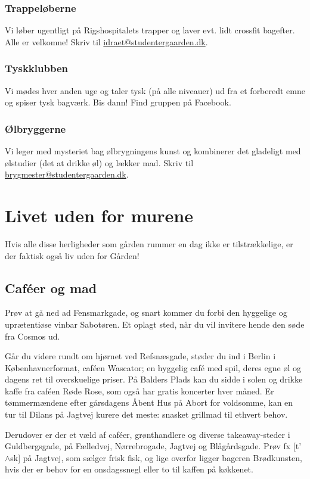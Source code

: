 \documentclass[11pt,article,twoside,openany,danish,extrafontsizes]{memoir} %
\begin{document}
\subsection{Trappeløberne}
Vi løber ugentligt på Rigshospitalets trapper og laver evt. lidt crossfit bagefter. Alle er velkomne! Skriv til \url{idraet@studentergaarden.dk}.

\subsection{Tyskklubben}
Vi mødes hver anden uge og taler tysk (på alle niveauer) ud fra et forberedt emne og  spiser tysk bagværk. Bis dann! Find gruppen på Facebook.

\subsection{Ølbryggerne}
Vi leger med mysteriet bag ølbrygningens kunst og kombinerer det gladeligt med ølstudier (det at drikke øl) og lækker mad. Skriv til \url{brygmester@studentergaarden.dk}.


\clearpage


\chapter{Livet uden for murene}
\label{chap:udenfor}

Hvis alle disse herligheder som gården rummer en dag ikke er tilstrækkelige, er der faktisk også liv uden for Gården!

\section{Caféer og mad}
Prøv at gå ned ad Fensmarkgade, og snart kommer du forbi den hyggelige og uprætentiøse vinbar Sabotøren. Et oplagt sted, når du vil invitere hende den søde fra Cosmos ud.

Går du videre rundt om hjørnet ved Refsnæsgade, støder du ind i Berlin i Københavnerformat, caféen Wascator; en hyggelig café med spil, deres egne øl og dagens ret til overskuelige priser. På Balders Plads kan du sidde i solen og drikke kaffe fra caféen Røde Rose, som også har gratis koncerter hver måned. Er tømmermændene efter gårsdagens Åbent Hus på Abort for voldsomme, kan en tur til Dilans på Jagtvej kurere det meste: snasket grillmad til ethvert behov.

Derudover er der et væld af caféer, grønthandlere og diverse takeaway-steder i Guldbergsgade, på Fælledvej, Nørrebrogade, Jagtvej og Blågårdsgade. Prøv fx [t'$\wedge$sk] på Jagtvej, som sælger frisk fisk, og lige overfor ligger bageren Brødkunsten, hvis der er behov for en onsdagssnegl eller to til kaffen på køkkenet.
\end{document}
